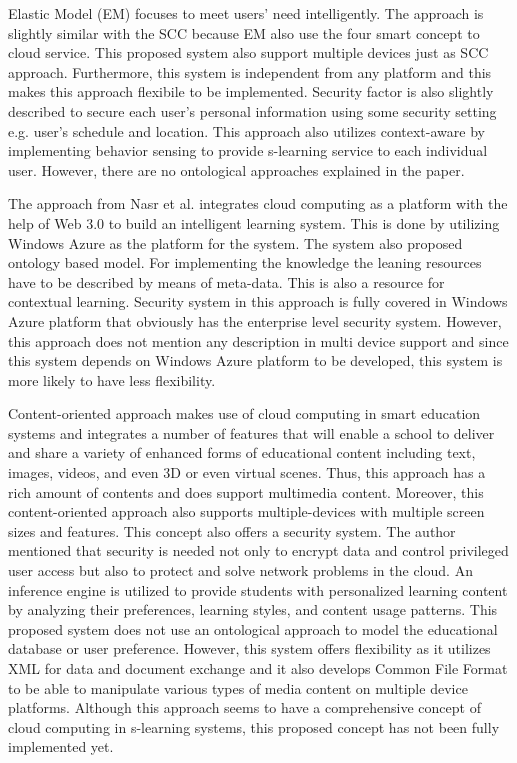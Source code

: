 \documentclass[journal]{vgtc}
\begin{document}
Elastic Model (EM) \cite{Kim2013} focuses to meet users' need intelligently. The approach is slightly similar with the SCC because EM also use the four smart concept to cloud service. This proposed system also support multiple devices just as SCC approach. Furthermore, this system is independent from any platform and this makes this approach flexibile to be implemented. Security factor is also slightly described to secure each user's personal information using some security setting e.g. user's schedule and location. This approach also utilizes context-aware by implementing behavior sensing to provide s-learning service to each individual user. However, there are no ontological approaches explained in the paper. 

The approach from Nasr et al. \cite{nasr2012proposed} integrates cloud computing as a platform with the help of Web 3.0 to build an intelligent learning system. This is done by utilizing Windows Azure as the platform for the system. The system also proposed ontology based model. For implementing the knowledge the leaning resources have to be described by means of meta-data. This is also a resource for contextual learning. Security system in this approach is fully covered in Windows Azure platform that obviously has the enterprise level security system. However, this approach does not mention any description in multi device support and since this system depends on Windows Azure platform to be developed, this system is more likely to have less flexibility.

Content-oriented approach \cite{jeong2013content} makes use of cloud computing in smart education systems and integrates a number of features that will enable a school to deliver and share a variety of enhanced forms of educational content including text, images, videos, and even 3D or even virtual scenes. Thus, this approach has a rich amount of contents and does support multimedia content. Moreover, this content-oriented approach also supports multiple-devices with multiple screen sizes and features. This concept also offers a security system. The author mentioned that security is needed not only to encrypt data and control privileged user access but also to protect and solve network problems in the cloud. An inference engine is utilized to provide students with personalized learning content by analyzing their preferences, learning styles, and content usage patterns. This proposed system does not use an ontological approach to model the educational database or user preference. However, this system offers flexibility as it utilizes XML for data and document exchange and it also develops Common File Format to be able to manipulate various types of media content on multiple device platforms. Although this approach seems to have a comprehensive concept of cloud computing in s-learning systems, this proposed concept has not been fully implemented yet.
\end{document}
